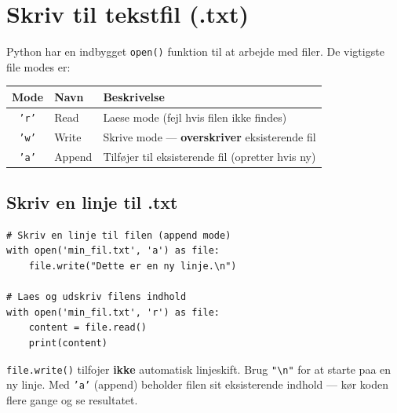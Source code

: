 \documentclass[12pt, a4paper]{article}
\begin{document}
\section{Skriv til tekstfil (.txt)}

Python har en indbygget \texttt{open()} funktion til at arbejde med filer.
De vigtigste file modes er:

\begin{center}
\begin{tabular}{cll}
\toprule
\textbf{Mode} & \textbf{Navn} & \textbf{Beskrivelse} \\
\midrule
\texttt{'r'} & Read    & Laese mode (fejl hvis filen ikke findes) \\
\texttt{'w'} & Write   & Skrive mode --- \textbf{overskriver} eksisterende fil \\
\texttt{'a'} & Append  & Tilføjer til eksisterende fil (opretter hvis ny) \\
\bottomrule
\end{tabular}
\end{center}

\subsection{Skriv en linje til .txt}

\begin{tcolorbox}[pythonbox, title={\faPython\quad Kode 1 --- Skriv og laes en tekstfil}]
\begin{verbatim}
# Skriv en linje til filen (append mode)
with open('min_fil.txt', 'a') as file:
    file.write("Dette er en ny linje.\n")

# Laes og udskriv filens indhold
with open('min_fil.txt', 'r') as file:
    content = file.read()
    print(content)
\end{verbatim}
\end{tcolorbox}

\begin{tcolorbox}[infobox, title={\faInfoCircle\quad \textbackslash n --- ny linje}]
\texttt{file.write()} tilfojer \textbf{ikke} automatisk linjeskift.
Brug \texttt{"\textbackslash n"} for at starte paa en ny linje.
Med \texttt{'a'} (append) beholder filen sit eksisterende indhold
--- kør koden flere gange og se resultatet.
\end{tcolorbox}
\end{document}
